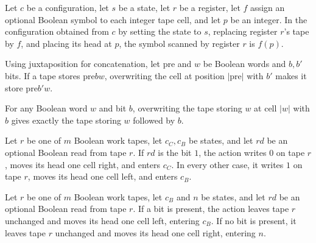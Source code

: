 \begin{lemma}
\label{Complexity.LogProg.regCfg_read}
\leanok
{}
Let $c$ be a configuration, let $s$ be a state, let $r$ be a register, let $f$ assign an
optional Boolean symbol to each integer tape cell, and let $p$ be an integer. In the
configuration obtained from $c$ by setting the state to $s$, replacing register $r$'s
tape by $f$, and placing its head at $p$, the symbol scanned by register $r$ is $f(p)$.
\end{lemma}

\begin{lemma}
\label{Complexity.LogProg.update_bufferTape_cons}
\leanok
{}
Using juxtaposition for concatenation, let $\mathrm{pre}$ and $w$ be Boolean words and $b,b'$ bits. If a tape stores $\mathrm{pre}bw$, overwriting the cell at position $|\mathrm{pre}|$ with $b'$ makes it store $\mathrm{pre}b'w$.
\end{lemma}

\begin{lemma}
\label{Complexity.LogProg.update_bufferTape_end}
\leanok
{}
For any Boolean word $w$ and bit $b$, overwriting the tape storing $w$ at cell $|w|$
with $b$ gives exactly the tape storing $w$ followed by $b$.
\end{lemma}

\begin{definition}
\label{Complexity.LogProg.incCAct}
\leanok
{}
Let $r$ be one of $m$ Boolean work tapes, let $c_C,c_B$ be states, and let $rd$ be an
optional Boolean read from tape $r$. If $rd$ is the bit $1$, the action writes $0$ on
tape $r$, moves its head one cell right, and enters $c_C$. In every other case, it
writes $1$ on tape $r$, moves its head one cell left, and enters $c_B$.
\end{definition}

\begin{definition}
\label{Complexity.LogProg.incBAct}
\leanok
{}
Let $r$ be one of $m$ Boolean work tapes, let $c_B$ and $n$ be states, and let $rd$ be
an optional Boolean read from tape $r$. If a bit is present, the action leaves tape $r$
unchanged and moves its head one cell left, entering $c_B$. If no bit is present, it
leaves tape $r$ unchanged and moves its head one cell right, entering $n$.
\end{definition}

